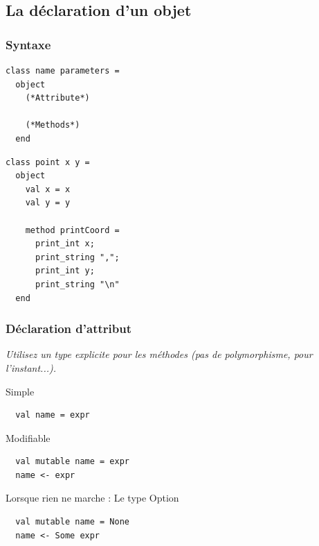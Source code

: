 \subsection{La déclaration d'un objet} %
\begin{frame}[fragile]
	\frametitle{Syntaxe}
	\begin{minipage}{0.45\textwidth}
		\lstset{basicstyle=\small}
		\begin{lstlisting}
class name parameters =
  object
    (*Attribute*)
    
    (*Methods*)
  end
		\end{lstlisting}
	\end{minipage}
	\begin{minipage}{0.4\textwidth}
		\begin{lstlisting}
class point x y =
  object
    val x = x
    val y = y

    method printCoord =
      print_int x;
      print_string ",";
      print_int y;
      print_string "\n"
  end
		\end{lstlisting}
	\end{minipage}
\end{frame}

\begin{frame}[fragile]
	\frametitle{Déclaration d'attribut}
	\textit{Utilisez un type explicite pour les méthodes (pas de polymorphisme, pour l'instant...).}\\
	\begin{block}{Simple}
		\begin{lstlisting}
  val name = expr
		\end{lstlisting}
	\end{block}
	\begin{block}{Modifiable}
		\begin{lstlisting}
  val mutable name = expr
  name <- expr
		\end{lstlisting}
	\end{block}
	\begin{block}{Lorsque rien ne marche : Le type Option}
		\begin{lstlisting}
  val mutable name = None
  name <- Some expr
		\end{lstlisting}
	\end{block}
\end{frame}

